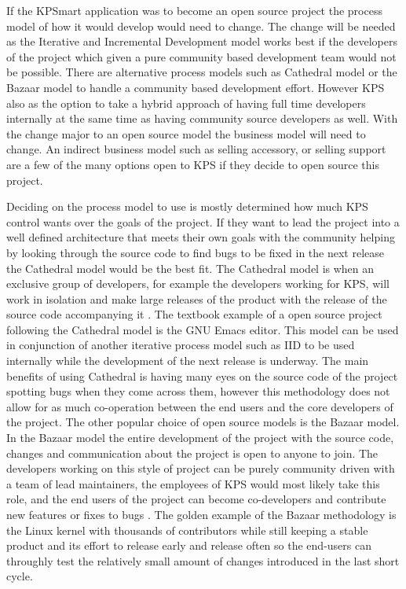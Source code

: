 \documentclass{style/CRPITStyle}
\renewcommand{\cite}{\citep}
\begin{document}
If the KPSmart application was to become an open source project the process
model of how it would develop would need to change. The change will be needed as
the Iterative and Incremental Development model works best if the developers of
the project which given a pure community based development team would not be
possible. There are alternative process models such as Cathedral
model or the Bazaar model to handle a community based development effort.
However KPS also as the option to take a hybrid approach of having full time
developers internally at the same time as having community source developers as
well. With the change major to an open source model the
business model will need to change. An indirect business model such as
selling accessory, or selling support are a few of the many options open to KPS
if they decide to open source this project.

\vspace{0.1in}

Deciding on the process model to use is mostly determined how much KPS control
wants over the goals of the project. If they want to lead the project into a
well defined architecture that meets their own goals with the community helping
by looking through the source code to find bugs to be fixed in the next release
the Cathedral model would be the best fit. The Cathedral model is when an
exclusive group of developers, for example the developers working for KPS, will
work in isolation and make large releases of the product with the release of the
source code accompanying it \cite{raymond:1999:cathedral}. The textbook example
of a open source project following the Cathedral model is the GNU Emacs editor.
This model can be used in conjunction of another iterative process model such as
IID to be used internally while the development of the next release is underway.
The main benefits of using Cathedral is having many eyes on the source code of
the project spotting bugs when they come across them, however this methodology
does not allow for as much co-operation between the end users and the core developers
of the project. The other popular choice of open source models is the Bazaar
model. In the Bazaar model the entire development of the project with the source
code, changes and communication about the project is open to anyone to join.
The developers working on this style of project can be purely community driven
with a team of lead maintainers, the employees of KPS would most likely take
this role, and the end users of the project can become co-developers and
contribute new features or fixes to bugs \cite{raymond:1999:cathedral}. 
The golden example of the Bazaar methodology is the Linux kernel with thousands
of contributors while still keeping a stable product and its effort to release
early and release often so the end-users can throughly test the relatively small 
amount of changes introduced in the last short cycle.
\end{document}
